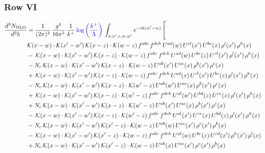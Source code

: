 \documentclass[9pt]{article}
\numberwithin{equation}{section}
\begin{document}
\subsubsection{Row VI}
\begin{align}
\frac{d^{3}N_{\mathrm{NLO}}}{d^{3}k} & = \frac{1}{(2\pi)^{3}}\,\frac{g^{4}}{16\pi^{5}}\,\frac{1}{k^{+}}\,{\color{blue}\log{\left(\frac{k^{+}}{\Lambda}\right)}}\,\int_{x,x',z,w,w'}e^{-ik(w'-w)}\,\Bigg[\notag\\ & \mathcal{K}(x-w)\cdot\mathcal{K}(x'-w')\,\mathcal{K}(x-z)\cdot\mathcal{K}(w-z)\,f^{abc}\,f^{deh}\,U^{ad}(w)\,U^{cl}(x')\,U^{be}(x)\,\rho^{l}(x')\,\rho^{h}(x)\notag\\
& -\,\mathcal{K}(x-w)\cdot\mathcal{K}(x'-w')\,\mathcal{K}(x-z)\cdot\mathcal{K}(w-z)\,f^{abc}\,f^{deh}\,U^{ad}(w)\,U^{be}(z)\,U^{cl}(x')\,\rho^{l}(x')\,\rho^{h}(x)\notag\\
& -N_{c}\,\mathcal{K}(x-w)\cdot\mathcal{K}(x'-w')\,\mathcal{K}(x-z)\cdot\mathcal{K}(w-z)\,U^{ab}(x')\,U^{ac}(x)\,\rho^{b}(x')\,\rho^{c}(x)\notag\\
& +\,\mathcal{K}(x-w)\cdot\mathcal{K}(x'-w')\,\mathcal{K}(x-z)\cdot\mathcal{K}(w-z)\,f^{abc}\,f^{deh}\,U^{ad}(x)\,U^{cl}(x')\,U^{be}(z)\,\rho^{l}(x')\,\rho^{h}(x)\notag\\
& -N_{c}\,\mathcal{K}(x-w)\cdot\mathcal{K}(x'-w')\,\mathcal{K}(x-z)\cdot\mathcal{K}(w'-z)\,U^{ab}(w')\,U^{ac}(x)\,\rho^{b}(x')\,\rho^{c}(x)\notag\\
& +\,\mathcal{K}(x-w)\cdot\mathcal{K}(x'-w')\,\mathcal{K}(x-z)\cdot\mathcal{K}(w'-z)\,f^{abc}\,f^{deh}\,U^{al}(w')\,U^{bd}(z)\,U^{ce}(x)\,\rho^{l}(x')\,\rho^{h}(x)\notag\\
& +N_{c}\,\mathcal{K}(x-w)\cdot\mathcal{K}(x'-w')\,\mathcal{K}(x-z)\cdot\mathcal{K}(w'-z)\,U^{ab}(x')\,U^{ac}(x)\,\rho^{b}(x')\,\rho^{c}(x)\notag\\
& -\,\mathcal{K}(x-w)\cdot\mathcal{K}(x'-w')\,\mathcal{K}(x-z)\cdot\mathcal{K}(w'-z)\,f^{abc}\,f^{deh}\,U^{al}(x')\,U^{ce}(x)\,U^{bd}(z)\,\rho^{l}(x')\,\rho^{h}(x)\notag\\
& -N_{c}\,\mathcal{K}(x-w)\cdot\mathcal{K}(x'-w')\,\mathcal{K}(x'-z)\cdot\mathcal{K}(w-z)\,U^{ab}(w)\,U^{ac}(x')\,\rho^{c}(x')\,\rho^{b}(x)\notag\\
& -\,\mathcal{K}(x-w)\cdot\mathcal{K}(x'-w')\,\mathcal{K}(x'-z)\cdot\mathcal{K}(w-z)\,f^{abc}\,f^{deh}\,U^{al}(w)\,U^{be}(z)\,U^{cd}(x')\,\rho^{h}(x')\,\rho^{l}(x)\notag\\
& +N_{c}\,\mathcal{K}(x-w)\cdot\mathcal{K}(x'-w')\,\mathcal{K}(x'-z)\cdot\mathcal{K}(w-z)\,U^{ab}(x)\,U^{ac}(x')\,\rho^{c}(x')\,\rho^{b}(x)\notag\\

\end{align}
\end{document}
